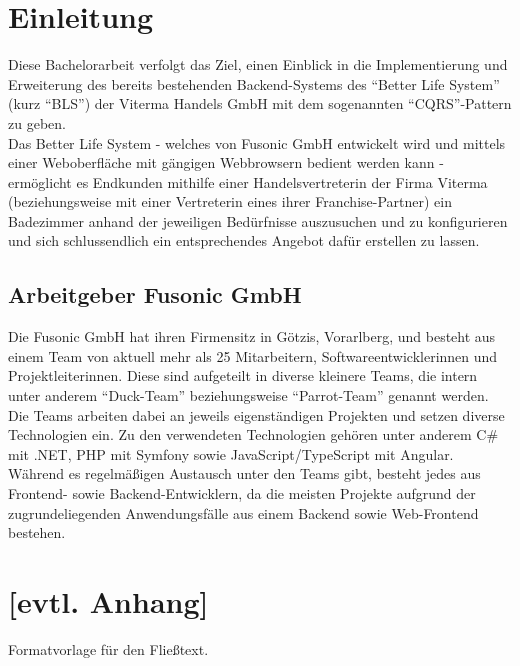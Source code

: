 \documentclass[a4paper,12pt,twoside]{scrreprt}
\begin{document}
\chapter{Einleitung}
Diese Bachelorarbeit verfolgt das Ziel, einen Einblick in die Implementierung und Erweiterung des bereits bestehenden Backend-Systems des {\enquote{Better Life System}} (kurz \enquote{BLS}) der Viterma Handels GmbH mit dem sogenannten \enquote{CQRS}-Pattern zu geben.\\
Das Better Life System - welches von Fusonic GmbH entwickelt wird und mittels einer Weboberfläche mit gängigen Webbrowsern bedient werden kann - ermöglicht es Endkunden mithilfe einer Handelsvertreterin der Firma Viterma (beziehungsweise mit einer Vertreterin eines ihrer Franchise-Partner) ein Badezimmer anhand der jeweiligen Bedürfnisse auszusuchen und zu konfigurieren und sich schlussendlich ein entsprechendes Angebot dafür erstellen zu lassen.

\section{Arbeitgeber Fusonic GmbH}
Die Fusonic GmbH hat ihren Firmensitz in Götzis, Vorarlberg, und besteht aus einem Team von aktuell mehr als 25 Mitarbeitern, Softwareentwicklerinnen und Projektleiterinnen. Diese sind aufgeteilt in diverse kleinere Teams, die intern unter anderem \enquote{Duck-Team} beziehungsweise \enquote{Parrot-Team} genannt werden. Die Teams arbeiten dabei an jeweils eigenständigen Projekten und setzen diverse Technologien ein. Zu den verwendeten Technologien gehören unter anderem C\# mit .NET, PHP mit Symfony sowie JavaScript/TypeScript mit Angular. \parencite[vgl.]["Übersicht aller Technologien"]{fusonic_gmbh_web_nodate} Während es  regelmäßigen Austausch unter den Teams gibt, besteht jedes aus Frontend- sowie Backend-Entwicklern, da die meisten Projekte aufgrund der zugrundeliegenden Anwendungsfälle aus einem Backend sowie Web-Frontend bestehen.

\clearpage
{}
{}
\printbibliography

\chapter*{[evtl. Anhang]}  %
Formatvorlage für den Fließtext.
\end{document}
